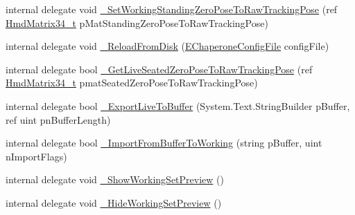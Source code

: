 \begin{DoxyCompactItemize}
internal delegate void \mbox{\hyperlink{struct_valve_1_1_v_r_1_1_i_v_r_chaperone_setup_a7cc1138b7593b23c7ac311cb1ecacb1f}{\+\_\+\+Set\+Working\+Standing\+Zero\+Pose\+To\+Raw\+Tracking\+Pose}} (ref \mbox{\hyperlink{struct_valve_1_1_v_r_1_1_hmd_matrix34__t}{Hmd\+Matrix34\+\_\+t}} p\+Mat\+Standing\+Zero\+Pose\+To\+Raw\+Tracking\+Pose)
\item 
internal delegate void \mbox{\hyperlink{struct_valve_1_1_v_r_1_1_i_v_r_chaperone_setup_aa5b1db0ac77ec3ffab299ca848375c98}{\+\_\+\+Reload\+From\+Disk}} (\mbox{\hyperlink{namespace_valve_1_1_v_r_a9d16676419221d1177d39fe862e1f7d1}{E\+Chaperone\+Config\+File}} config\+File)
\item 
internal delegate bool \mbox{\hyperlink{struct_valve_1_1_v_r_1_1_i_v_r_chaperone_setup_a2e6aaeb62d03003acf2b93f46f82c0cf}{\+\_\+\+Get\+Live\+Seated\+Zero\+Pose\+To\+Raw\+Tracking\+Pose}} (ref \mbox{\hyperlink{struct_valve_1_1_v_r_1_1_hmd_matrix34__t}{Hmd\+Matrix34\+\_\+t}} pmat\+Seated\+Zero\+Pose\+To\+Raw\+Tracking\+Pose)
\item 
internal delegate bool \mbox{\hyperlink{struct_valve_1_1_v_r_1_1_i_v_r_chaperone_setup_ae409410db28f2452275177a98e0a8465}{\+\_\+\+Export\+Live\+To\+Buffer}} (System.\+Text.\+String\+Builder p\+Buffer, ref uint pn\+Buffer\+Length)
\item 
internal delegate bool \mbox{\hyperlink{struct_valve_1_1_v_r_1_1_i_v_r_chaperone_setup_a32c372407593bf70f257cbd766b9935c}{\+\_\+\+Import\+From\+Buffer\+To\+Working}} (string p\+Buffer, uint n\+Import\+Flags)
\item 
internal delegate void \mbox{\hyperlink{struct_valve_1_1_v_r_1_1_i_v_r_chaperone_setup_a3bfcf023d5b22e50ec327fd4862751a1}{\+\_\+\+Show\+Working\+Set\+Preview}} ()
\item 
internal delegate void \mbox{\hyperlink{struct_valve_1_1_v_r_1_1_i_v_r_chaperone_setup_a403f94b7d21f3dbf8c27c3de8b346bce}{\+\_\+\+Hide\+Working\+Set\+Preview}} ()
\end{DoxyCompactItemize}
